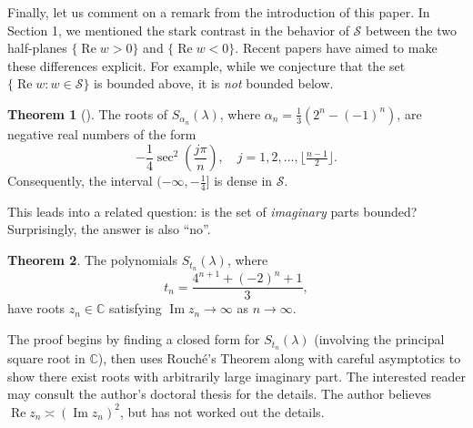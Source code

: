 \documentclass[11pt]{article}
\theoremstyle{definition}
\newtheorem{thm}{Theorem}
\newcommand{\stern}[2]{S_{#1}(#2)}
\renewcommand{\Re}{\operatorname{Re}}
\renewcommand{\Im}{\operatorname{Im}}
\newcommand{\lm}{\lambda}
\newcommand{\C}{\mathbb C}
\newcommand{\calS}{\mathcal S}
\begin{document}
Finally, let us comment on a remark from the introduction of this paper.  In Section 1, we mentioned the stark contrast in the behavior of $\calS$ between the two half-planes $\{\Re w > 0\}$ and $\{\Re w < 0\}$.  Recent papers have aimed to make these differences explicit.  For example, while we conjecture that the set $\{\Re w: w\in \calS\}$ is bounded above, it is \textit{not} bounded below.

\begin{thm}[{\cite[Proposition 3.3]{Dilcher2017}}] The roots of $\stern{\alpha_n}\lm$, where $\alpha_n = \tfrac13(2^n - (-1)^n)$, are negative real numbers of the form 
\[
-\frac14\sec^2\left(\frac{j\pi}n\right), \quad j = 1,2,\ldots, \lfloor\tfrac{n-1}2\rfloor.
\]
Consequently, the interval $(-\infty,-\tfrac14]$ is dense in $\calS$.
\end{thm}

This leads into a related question: is the set of \textit{imaginary} parts bounded?  Surprisingly, the answer is also ``no''.

\begin{thm}
The polynomials $\stern{t_n}\lm$, where
\[
t_n = \frac{4^{n+1} + (-2)^n + 1}3,
\]
have roots $z_n\in\C$ satisfying $\Im z_n\to\infty$ as $n\to\infty$.
\end{thm}

The proof begins by finding a closed form for $\stern{t_n}\lm$ (involving the principal square root in $\mathbb C$), then uses Rouch{\'e}'s Theorem along with careful asymptotics to show there exist roots with arbitrarily large imaginary part.  The interested reader may consult the author's doctoral thesis \cite{Altizio2025} for the details.  The author believes $\Re z_n \asymp (\Im z_n)^2$, but has not worked out the details.



\end{document}
